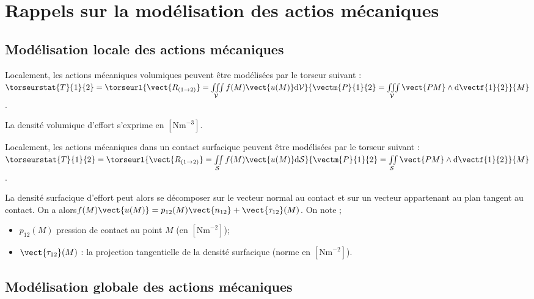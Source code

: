 \setchapterpreamble[u]{\margintoc}

\chapter{Rappels sur la modélisation des actios mécaniques}




\section{Modélisation locale des actions mécaniques}
\begin{defi}
Localement, les actions mécaniques volumiques peuvent être modélisées par le torseur suivant :
$
\torseurstat{T}{1}{2}=
\torseurl{%
\vect{R_{(1\rightarrow 2)}} 
= \iiint\limits_{\mathcal{V}} f(M) \vect{u(M)} \text{d}\mathcal{V}}{%
\vectm{P}{1}{2} = \iiint\limits_{\mathcal{V}}\vect{PM}\wedge \text{d}\vectf{1}{2}}{M}
$.

La densité volumique d'effort s'exprime en $\left[\text{Nm}^{-3}\right]$.
\end{defi}

\begin{defi}
Localement, les actions mécaniques dans un contact surfacique peuvent être modélisées par le torseur suivant :
$
\torseurstat{T}{1}{2}=
\torseurl{%
\vect{R_{(1\rightarrow 2)}} 
= \iint\limits_{\mathcal{S}} f(M) \vect{u(M)} \text{d}\mathcal{S}}{%
\vectm{P}{1}{2} = \iint\limits_{\mathcal{S}}\vect{PM}\wedge \text{d}\vectf{1}{2}}{M}
$.

La densité surfacique d'effort peut alors se décomposer sur le vecteur normal au contact et sur un vecteur appartenant au plan tangent au contact. On a alors$f(M) \vect{u(M)} = p_{12}(M)\vect{n_{12}}+\vect{\tau_{12}}(M)$. 
On note ;
\begin{itemize}
\item $p_{12}(M)$ pression de contact au point $M$ (en $\left[\text{Nm}^{-2}\right]$);
\item $\vect{\tau_{12}}(M)$ : la projection tangentielle de la densité surfacique (norme en $\left[\text{Nm}^{-2}\right]$).
\end{itemize}
\end{defi}

\section{Modélisation globale des actions mécaniques}

